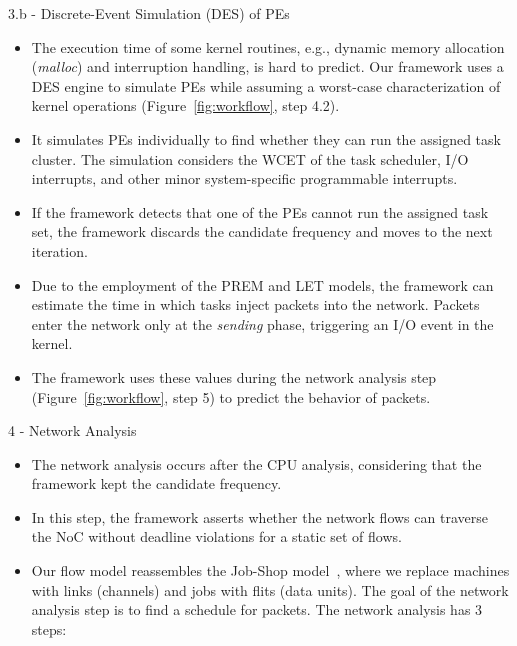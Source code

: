 \begin{frame}{3.b - Discrete-Event Simulation (DES) of PEs}
	
	\begin{itemize}
		
		\item The execution time of some kernel routines, e.g., dynamic memory allocation (\textit{malloc}) and interruption handling, is hard to predict. Our framework uses a DES engine to simulate PEs while assuming a worst-case characterization of kernel operations (Figure~\ref{fig:workflow}, step 4.2).
		
		\item It simulates PEs individually to find whether they can run the assigned task cluster. The simulation considers the WCET of the task scheduler, I/O interrupts, and other minor system-specific programmable interrupts. 
		
		\item If the framework detects that one of the PEs cannot run the assigned task set, the framework discards the candidate frequency and moves to the next iteration. 
		
		\item Due to the employment of the PREM and LET models, the framework can estimate the time in which tasks inject packets into the network. Packets enter the network only at the \textit{sending} phase, triggering an I/O event in the kernel. 
		
		\item The framework uses these values during the network analysis step (Figure~\ref{fig:workflow}, step 5) to predict the behavior of packets.
		
	\end{itemize}

\end{frame}



\begin{frame}{4 - Network Analysis}
	
	\begin{itemize}
		\item The network analysis occurs after the CPU analysis, considering that the framework kept the candidate frequency. 
		
		\item In this step, the framework asserts whether the network flows can traverse the NoC without deadline violations for a static set of flows. 
		
		\item Our flow model reassembles the Job-Shop model~\cite{Garey:1979}, where we replace machines with links (channels) and jobs with flits (data units). The goal of the network analysis step is to find a schedule for packets. The network analysis has 3 steps:
		
	\end{itemize}
\end{frame}

